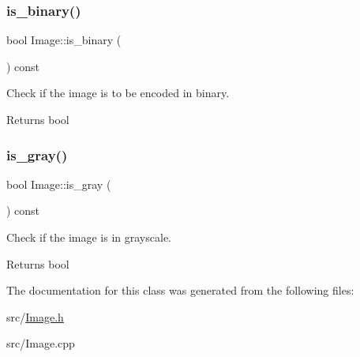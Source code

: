 \subsubsection{\texorpdfstring{is\+\_\+binary()}{is\_binary()}}
{\footnotesize\ttfamily bool Image\+::is\+\_\+binary (\begin{DoxyParamCaption}{ }\end{DoxyParamCaption}) const}



Check if the image is to be encoded in binary. 

\begin{DoxyReturn}{Returns}
bool 
\end{DoxyReturn}
\mbox{\label{classImage_a312d5af7ef1f889ad1742b24638d86de}} 
\subsubsection{\texorpdfstring{is\+\_\+gray()}{is\_gray()}}
{\footnotesize\ttfamily bool Image\+::is\+\_\+gray (\begin{DoxyParamCaption}{ }\end{DoxyParamCaption}) const}



Check if the image is in grayscale. 

\begin{DoxyReturn}{Returns}
bool 
\end{DoxyReturn}


The documentation for this class was generated from the following files\+:\begin{DoxyCompactItemize}
\item 
src/\hyperlink{Image_8h}{Image.\+h}\item 
src/Image.\+cpp\end{DoxyCompactItemize}
